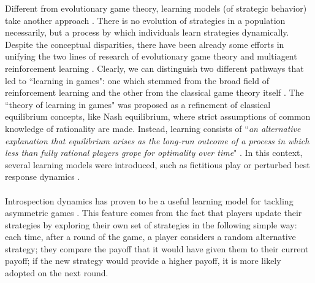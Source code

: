 \documentclass[11pt]{article}
\theoremstyle{plainCl1}
\theoremstyle{plainCl2}
\begin{document}

\noindent Different from evolutionary game theory, learning models (of strategic behavior) take another approach \cite{Sandholm:BioSys:1996, Fudenberg:book:1998b, Macy:PNAS:2002, Hofbauer:GEB:2005, Tuyls:bookchapter:2005, Galla:PNAS:2013, Barfuss:PRE:2019, Barfuss:PNAS:2020, Pangallo:GEB:2022}. There is no evolution of strategies in a population necessarily, but a process by which individuals learn strategies dynamically. 
Despite the conceptual disparities, there have been already some efforts in unifying the two lines of research of evolutionary game theory and multiagent reinforcement learning \cite{Macy:PNAS:2002, Tuyls:bookchapter:2005, Bloembergen:JAIR:2015, Zhang:arxiv:2022}. 
\noindent Clearly, we can distinguish two different pathways that led to ``learning in games": one which stemmed from the broad field of reinforcement learning \cite{Sandholm:BioSys:1996} and the other from the classical game theory itself \cite{Fudenberg:book:1998b}. The ``theory of learning in games" was proposed as a refinement of classical equilibrium concepts, like Nash equilibrium, where strict assumptions of common knowledge of rationality are made. Instead, learning consists of ``\textit{an alternative explanation that equilibrium arises as the long-run outcome of a process in which less than fully rational players grope for optimality over time}" \cite{Fudenberg:book:1998b}. In this context, several learning models were introduced, such as fictitious play \cite{Gaunersdorfer:GEB:1995} or perturbed best response dynamics \cite{Hofbauer:GEB:2005}.
\\  \\
\noindent Introspection dynamics has proven to be a useful learning model for tackling asymmetric games \cite{Couto:NJP:2022, Hauser:Nature:2019, McAvoy:PNASnexus:2022, Schmid:PlosCB:2022}. 
This feature comes from the fact that players update their strategies by exploring their own set of strategies in the following simple way: each time, after a round of the game, a player considers a random alternative strategy; they compare the payoff that it would have given them to their current payoff; if the new strategy would provide a higher payoff, it is more likely adopted on the next round. 
\end{document}

